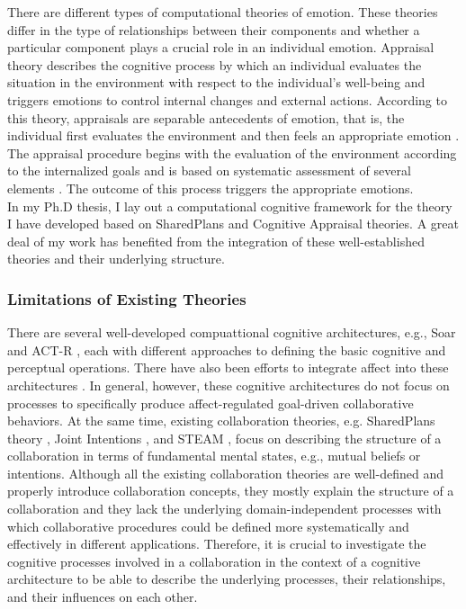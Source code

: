 \documentclass[a4paper, 11pt]{article}
\begin{document}
\begin{small}
There are different types of computational theories of emotion. These theories
differ in the type of relationships between their components and whether a
particular component plays a crucial role in an individual emotion. Appraisal
theory describes the cognitive process by which an individual evaluates the
situation in the environment with respect to the individual's well-being and
triggers emotions to control internal changes and external actions. According to
this theory, appraisals are separable antecedents of emotion, that is, the
individual first evaluates the environment and then feels an appropriate emotion
\cite{scherer:appraisal-processes}. The appraisal procedure begins with the
evaluation of the environment according to the internalized goals and is based
on systematic assessment of several elements
\cite{scherer:sequential-appraisal-process}. The outcome of this process
triggers the appropriate emotions.\\

In my Ph.D thesis, I lay out a computational cognitive framework for the theory
I have developed based on SharedPlans and Cognitive Appraisal theories. A great
deal of my work has benefited from the integration of these well-established
theories and their underlying structure.

\subsubsection*{Limitations of Existing Theories}

There are several well-developed compuattional cognitive architectures, e.g.,
Soar \cite{laird:soar} and ACT-R \cite{anderson:act-r}, each with different
approaches to defining the basic cognitive and perceptual operations. There have
also been efforts to integrate affect into these architectures
\cite{marinier:behavior-emotion}. In general, however, these cognitive
architectures do not focus on processes to specifically produce affect-regulated
goal-driven collaborative behaviors. At the same time, existing collaboration
theories, e.g. SharedPlans theory \cite{grosz:plans-discourse}, Joint Intentions
\cite{cohen:teamwork}, and STEAM \cite{tambe:flexible-teamwork}, focus on
describing the structure of a collaboration in terms of fundamental mental
states, e.g., mutual beliefs or intentions. Although all the existing
collaboration theories are well-defined and properly introduce collaboration
concepts, they mostly explain the structure of a collaboration and they lack the
underlying domain-independent processes with which collaborative procedures
could be defined more systematically and effectively in different applications.
Therefore, it is crucial to investigate the cognitive processes involved in a
collaboration in the context of a cognitive architecture to be able to describe
the underlying processes, their relationships, and their influences on each
other.


\end{small}
\end{document}
